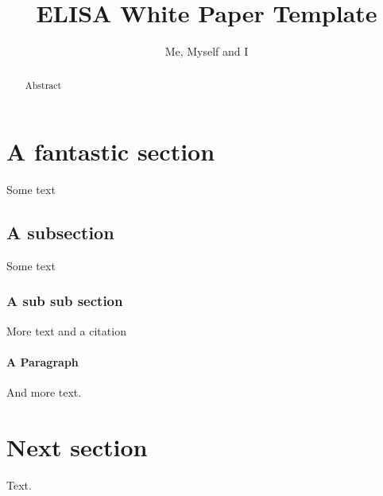 \documentclass[12pt]{../Common_files/ElisaPaper}
\title{ELISA White Paper Template}
\author{Me, Myself and I}
\begin{document}
	
\maketitle	
\begin{abstract}
Abstract
\end{abstract}

\tableofcontents

\section{A fantastic section}
Some text
\subsection{A subsection}
Some text

\subsubsection{A sub sub section}
More text and a citation \cite{ISO26262:2018}

\paragraph{A Paragraph}
And more text.

\section{Next section}
Text.
{}

	
\end{document}
